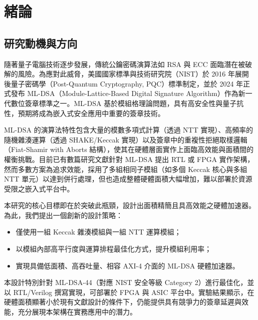 \documentclass[12pt, a4paper]{./styles/ntust_report}
\begin{document}
\baselineskip=24pt  %
\setcounter{chapter}{0} \fi

\chapter{緒論} \label{cha:intro}

\section{研究動機與方向}

隨著量子電腦技術逐步發展，傳統公鑰密碼演算法如 RSA 與 ECC 面臨潛在被破解的風險。為應對此威脅，美國國家標準與技術研究院（NIST）於 2016 年展開後量子密碼學（Post-Quantum Cryptography, PQC）標準制定，並於 2024 年正式發布 ML-DSA（Module-Lattice-Based Digital Signature Algorithm）作為新一代數位簽章標準之一。ML-DSA 基於模組格理論問題，具有高安全性與量子抗性，預期將成為嵌入式安全應用中重要的簽章技術。

ML-DSA 的演算法特性包含大量的模數多項式計算（透過 NTT 實現）、高頻率的隨機雜湊運算（透過 SHAKE/Keccak 實現）以及簽章中的重複性拒絕取樣邏輯（Fiat-Shamir with Aborts 結構），使其在硬體層面實作上面臨高效能與面積間的權衡挑戰。目前已有數篇研究文獻針對 ML-DSA 提出 RTL 或 FPGA 實作架構，然而多數方案為追求效能，採用了多組相同子模組（如多個 Keccak 核心與多組 NTT 單元）以達到併行處理，但也造成整體硬體面積大幅增加，難以部署於資源受限之嵌入式平台中。

本研究的核心目標即在於突破此瓶頸，設計出面積精簡且具高效能之硬體加速器。為此，我們提出一個創新的設計策略：
\begin{itemize}
    \item 僅使用一組 Keccak 雜湊模組與一組 NTT 運算模組；
    \item 以模組內部高平行度與運算排程最佳化方式，提升模組利用率；
    \item 實現具備低面積、高吞吐量、相容 AXI-4 介面的 ML-DSA 硬體加速器。
\end{itemize}

本設計特別針對 ML-DSA-44（對應 NIST 安全等級 Category 2）進行最佳化，並以 RTL/Verilog 撰寫實現，可部署於 FPGA 與 ASIC 平台中。實驗結果顯示，在硬體面積顯著小於現有文獻設計的條件下，仍能提供具有競爭力的簽章延遲與效能，充分展現本架構在實務應用中的潛力。
\end{document}
